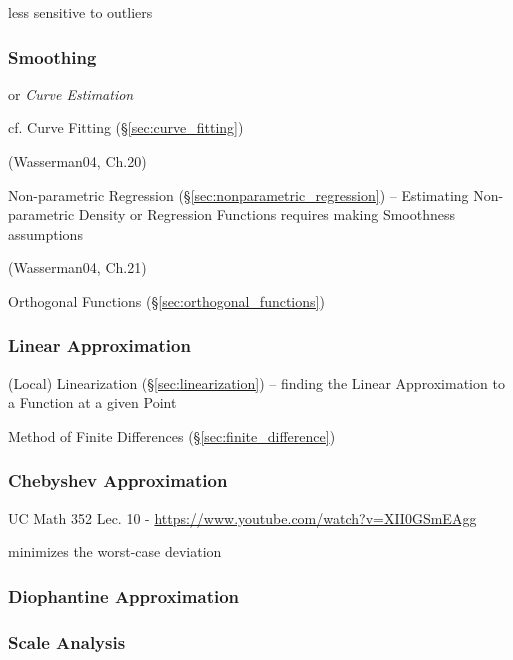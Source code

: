 less sensitive to outliers



\subsubsection{Smoothing}\label{sec:smoothing}

or \emph{Curve Estimation}

cf. Curve Fitting (\S\ref{sec:curve_fitting})

(Wasserman04, Ch.20)

Non-parametric Regression (\S\ref{sec:nonparametric_regression}) -- Estimating
Non-parametric Density or Regression Functions requires making Smoothness
assumptions

(Wasserman04, Ch.21)

Orthogonal Functions (\S\ref{sec:orthogonal_functions})



\subsubsection{Linear Approximation}\label{sec:linear_approximation}

\fist (Local) Linearization (\S\ref{sec:linearization}) -- finding the Linear
Approximation to a Function at a given Point

\fist Method of Finite Differences (\S\ref{sec:finite_difference})



\subsubsection{Chebyshev Approximation}\label{sec:chebyshev_approximation}

UC Math 352 Lec. 10 - \url{https://www.youtube.com/watch?v=XII0GSmEAgg}

minimizes the worst-case deviation



\subsubsection{Diophantine Approximation}\label{sec:diophantine_approximation}

\subsubsection{Scale Analysis}\label{sec:scale_analysis}

